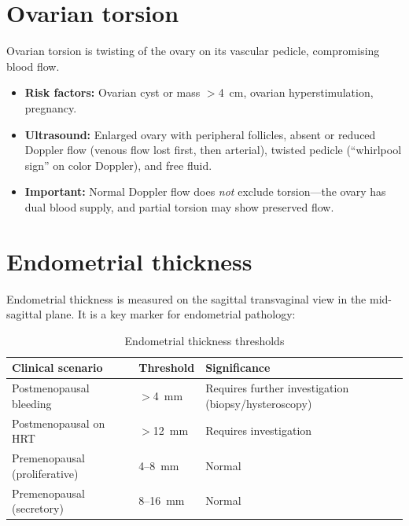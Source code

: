 \section{Ovarian torsion}
Ovarian torsion is twisting of the ovary on its vascular pedicle, compromising blood flow.
\begin{itemize}
    \item \textbf{Risk factors:} Ovarian cyst or mass $>$4~cm, ovarian hyperstimulation, pregnancy.
    \item \textbf{Ultrasound:} Enlarged ovary with peripheral follicles, absent or reduced Doppler flow (venous flow lost first, then arterial), twisted pedicle (``whirlpool sign'' on color Doppler), and free fluid.
    \item \textbf{Important:} Normal Doppler flow does \emph{not} exclude torsion---the ovary has dual blood supply, and partial torsion may show preserved flow.
\end{itemize}

\section{Endometrial thickness}
Endometrial thickness is measured on the sagittal transvaginal view in the mid-sagittal plane. It is a key marker for endometrial pathology:

\begin{table}[h]
\centering
\caption{Endometrial thickness thresholds}
\label{tab:endometrium}
\begin{tabular}{@{}p{}p{}p{}@{}}
\hline
\textbf{Clinical scenario} & \textbf{Threshold} & \textbf{Significance} \\
\hline
Postmenopausal bleeding & $>$4~mm & Requires further investigation (biopsy/hysteroscopy) \\
Postmenopausal on HRT & $>$12~mm & Requires investigation \\
Premenopausal (proliferative) & 4--8~mm & Normal \\
Premenopausal (secretory) & 8--16~mm & Normal \\
\hline
\end{tabular}
\end{table}

